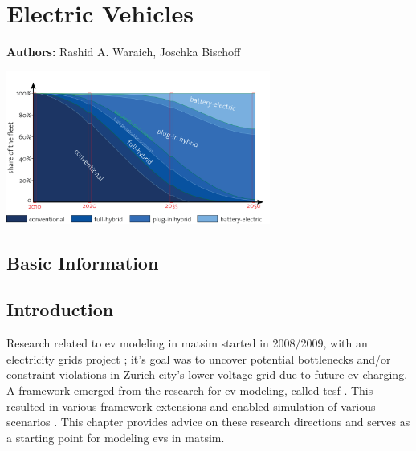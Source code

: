 \chapter{Electric Vehicles}
\label{ch:elvehicles}

\hfill \textbf{Authors:} Rashid A. Waraich, Joschka Bischoff

\begin{center} \includegraphics[width=0.65\textwidth, angle=0]{extending/figures/Elvehicles/main.png} \end{center}


\section{Basic Information}

\section{Introduction}
Research related to \gls{ev} modeling in \gls{matsim} started in 2008/2009, with an electricity grids project \citep[][]{WaraichEtAl_TRR_2013}; it's goal was to uncover potential bottlenecks and/or constraint violations in Zurich city's lower voltage grid due to future \gls{ev} charging. A framework emerged from the research for \gls{ev} modeling, called \gls{tesf} \citep[][]{WaraichEtAl_JanssensEtAl_2014}. This resulted in various framework extensions and enabled simulation of various scenarios \citep[][]{WaraichEtAl_JanssensEtAl_2014, Waraich_PhDThesis_2014, AbedinWaraich_JSDEWES_2014, Schieffer_MastersThesis_2011, GalusAndersson_CIGRE_2011, GalusEtAl_ResRep_EWZ_2012, Bischoff2013MaTaxis, BischoffMaciejewskiEcabMielecMobilTUM}. This chapter provides advice on these research directions and serves as a starting point for modeling \glspl{ev} in \gls{matsim}.

